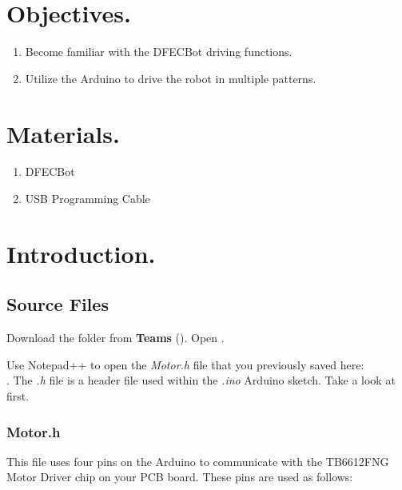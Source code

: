 \documentclass{handout}
\begin{document}
	\maketitle

	\section{Objectives.} 
	\begin{enumerate}
		\item Become familiar with the DFECBot driving functions.
		\item Utilize the Arduino to drive the robot in multiple patterns.
	\end{enumerate}
	
	\section{Materials.}
	\begin{enumerate}
		\item DFECBot
		\item USB Programming Cable
	\end{enumerate}

	
	\section{Introduction.}
	
	\subsection{Source Files}
	Download the  folder from \textbf{Teams} (). Open . 
	
	
	Use Notepad++ to open the \textit{Motor.h} file that you previously saved here:\\ . The \textit{.h} file is a header file used within the \textit{.ino}  Arduino sketch. Take a look at  first.
	
	\subsubsection{Motor.h}
	This file uses four pins on the Arduino to communicate with the TB6612FNG Motor Driver chip on your PCB board. These pins are used as follows:
	
\end{document}
